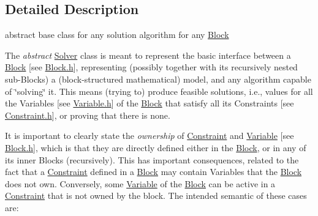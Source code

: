 \subsection{Detailed Description}
abstract base class for any solution algorithm for any \mbox{\hyperlink{class_s_m_spp__di__unipi__it_1_1_block}{Block}} 

The {\itshape abstract} \mbox{\hyperlink{class_s_m_spp__di__unipi__it_1_1_solver}{Solver}} class is meant to represent the basic interface between a \mbox{\hyperlink{class_s_m_spp__di__unipi__it_1_1_block}{Block}} \mbox{[}see \mbox{\hyperlink{_block_8h}{Block.\+h}}\mbox{]}, representing (possibly together with its recursively nested sub-\/\+Blocks) a (block-\/structured mathematical) model, and any algorithm capable of \char`\"{}solving\char`\"{} it. This means (trying to) produce feasible solutions, i.\+e., values for all the Variables \mbox{[}see \mbox{\hyperlink{_variable_8h}{Variable.\+h}}\mbox{]} of the \mbox{\hyperlink{class_s_m_spp__di__unipi__it_1_1_block}{Block}} that satisfy all its Constraints \mbox{[}see \mbox{\hyperlink{_constraint_8h}{Constraint.\+h}}\mbox{]}, or proving that there is none.

It is important to clearly state the {\itshape ownership} of \mbox{\hyperlink{class_s_m_spp__di__unipi__it_1_1_constraint}{Constraint}} and \mbox{\hyperlink{class_s_m_spp__di__unipi__it_1_1_variable}{Variable}} \mbox{[}see \mbox{\hyperlink{_block_8h}{Block.\+h}}\mbox{]}, which is that they are directly defined either in the \mbox{\hyperlink{class_s_m_spp__di__unipi__it_1_1_block}{Block}}, or in any of its inner Blocks (recursively). This has important consequences, related to the fact that a \mbox{\hyperlink{class_s_m_spp__di__unipi__it_1_1_constraint}{Constraint}} defined in a \mbox{\hyperlink{class_s_m_spp__di__unipi__it_1_1_block}{Block}} may contain Variables that the \mbox{\hyperlink{class_s_m_spp__di__unipi__it_1_1_block}{Block}} does not own. Conversely, some \mbox{\hyperlink{class_s_m_spp__di__unipi__it_1_1_variable}{Variable}} of the \mbox{\hyperlink{class_s_m_spp__di__unipi__it_1_1_block}{Block}} can be active in a \mbox{\hyperlink{class_s_m_spp__di__unipi__it_1_1_constraint}{Constraint}} that is not owned by the block. The intended semantic of these cases are\+:


